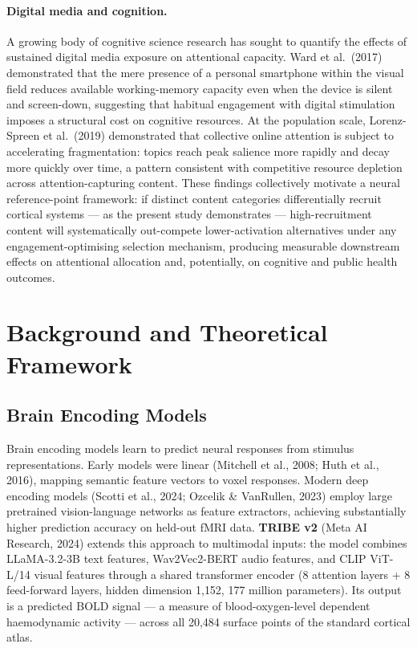 \documentclass[11pt,letterpaper]{article}
\numberwithin{equation}{section}
\begin{document}
\paragraph{Digital media and cognition.} A growing body of cognitive science research has sought to quantify the effects of sustained digital media exposure on attentional capacity. Ward et al.\ (2017) demonstrated that the mere presence of a personal smartphone within the visual field reduces available working-memory capacity even when the device is silent and screen-down, suggesting that habitual engagement with digital stimulation imposes a structural cost on cognitive resources. At the population scale, Lorenz-Spreen et al.\ (2019) demonstrated that collective online attention is subject to accelerating fragmentation: topics reach peak salience more rapidly and decay more quickly over time, a pattern consistent with competitive resource depletion across attention-capturing content. These findings collectively motivate a neural reference-point framework: if distinct content categories differentially recruit cortical systems --- as the present study demonstrates --- high-recruitment content will systematically out-compete lower-activation alternatives under any engagement-optimising selection mechanism, producing measurable downstream effects on attentional allocation and, potentially, on cognitive and public health outcomes.

\section{Background and Theoretical Framework}

\subsection{Brain Encoding Models}

Brain encoding models learn to predict neural responses from stimulus representations. Early models were linear (Mitchell et al., 2008; Huth et al., 2016), mapping semantic feature vectors to voxel responses. Modern deep encoding models (Scotti et al., 2024; Ozcelik \& VanRullen, 2023) employ large pretrained vision-language networks as feature extractors, achieving substantially higher prediction accuracy on held-out fMRI data. \textbf{TRIBE v2} (Meta AI Research, 2024) extends this approach to multimodal inputs: the model combines LLaMA-3.2-3B text features, Wav2Vec2-BERT audio features, and CLIP ViT-L/14 visual features through a shared transformer encoder (8 attention layers + 8 feed-forward layers, hidden dimension 1{,}152, 177 million parameters). Its output is a predicted BOLD signal --- a measure of blood-oxygen-level dependent haemodynamic activity --- across all 20{,}484 surface points of the standard cortical atlas.
\end{document}
